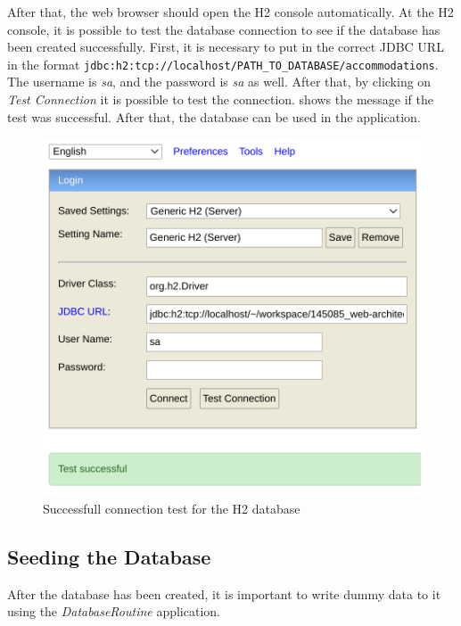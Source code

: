 After that, the web browser should open the H2 console automatically. At the H2 console, it is possible to test the database connection to see if the database has been created successfully.
First, it is necessary to put in the correct JDBC URL in the format \texttt{jdbc:h2:tcp://localhost/PATH\_TO\_DATABASE/accommodations}. The username is \textit{sa}, and the password is \textit{sa} as well. After that, by clicking on \textit{Test Connection} it is possible to test the connection.  shows the message if the test was successful. After that, the database can be used in the application.
\begin{figure}[h]
\centering
\includegraphics[scale=0.3]{images/03_depl/h2_test}
\caption{Successfull connection test for the H2 database}
\label{fig:03_depl_createdb_h2test}
\end{figure}


\subsection{Seeding the Database}\label{sec:03_depl_seeddb}
After the database has been created, it is important to write dummy data to it using the \textit{DatabaseRoutine} application.


